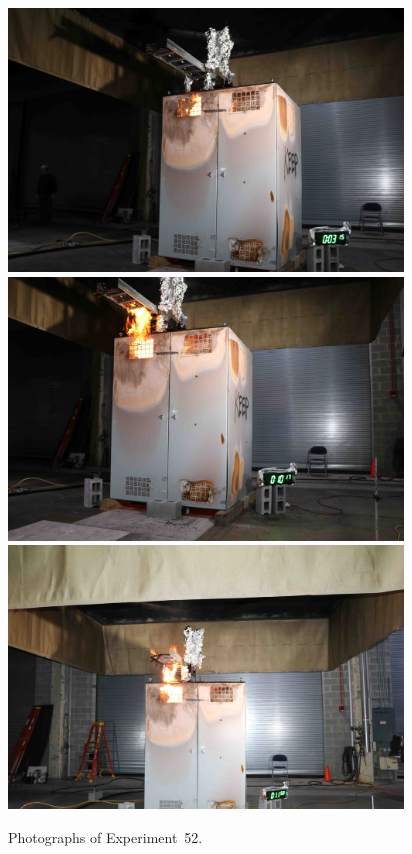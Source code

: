 \begin{figure}[p]
\centering
\includegraphics[height=2.75in]{../FIGURES/Test_52_3_min_15_s} \\
\includegraphics[height=2.75in]{../FIGURES/Test_52_10_min_17_s} \\
\includegraphics[height=2.75in]{../FIGURES/Test_52_11_min_50_s}
\caption[Photographs of Experiment~52]{Photographs of Experiment~52.}
\label{fig:Test_52_photos}
\end{figure}


\clearpage

